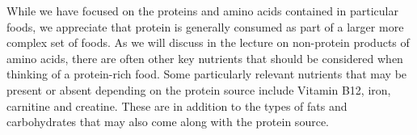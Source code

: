 \documentclass{tufte-handout}
\begin{document}
While we have focused on the proteins and amino acids contained in particular foods, we appreciate that protein is generally consumed as part of a larger more complex set of foods.  As we will discuss in the lecture on non-protein products of amino acids, there are often other key nutrients that should be considered when thinking of a protein-rich food.  Some particularly relevant nutrients that may be present or absent depending on the protein source include Vitamin B12, iron, carnitine and creatine.  These are in addition to the types of fats and carbohydrates that may also come along with the protein source. 



\end{document}
